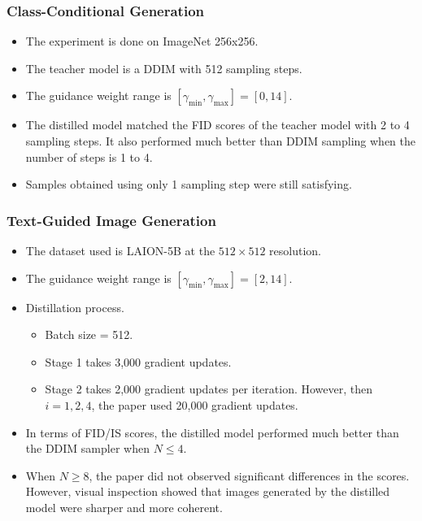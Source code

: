 \documentclass[10pt]{article}
\begin{document}
\subsubsection{Class-Conditional Generation}

\begin{itemize}
  \item The experiment is done on ImageNet 256x256.
  
  \item The teacher model is a DDIM with 512 sampling steps.
  
  \item The guidance weight range is $[\gamma_{\min}, \gamma_{\max}] = [0,14]$.
  
  \item The distilled model matched the FID scores of the teacher model with 2 to 4 sampling steps. It also performed much better than DDIM sampling when the number of steps is 1 to 4.
  
  \item Samples obtained using only 1 sampling step were still satisfying.
\end{itemize}

\subsubsection{Text-Guided Image Generation}

\begin{itemize}
  \item The dataset used is LAION-5B at the $512 \times 512$ resolution.
  
  \item The guidance weight range is $[\gamma_{\min}, \gamma_{\max}] = [2,14]$.
  
  \item Distillation process.
  \begin{itemize}
    \item Batch size = 512.
    \item Stage 1 takes 3,000 gradient updates.
    \item Stage 2 takes 2,000 gradient updates per iteration. However, then $i = 1, 2, 4$, the paper used 20,000 gradient updates.
  \end{itemize}

  \item In terms of FID/IS scores, the distilled model performed much better than the DDIM sampler when $N \leq 4$.
  
  \item When $N \geq 8$, the paper did not observed significant differences in the scores. However, visual inspection showed that images generated by the distilled model were sharper and more coherent.
\end{itemize}


  
\end{document}
